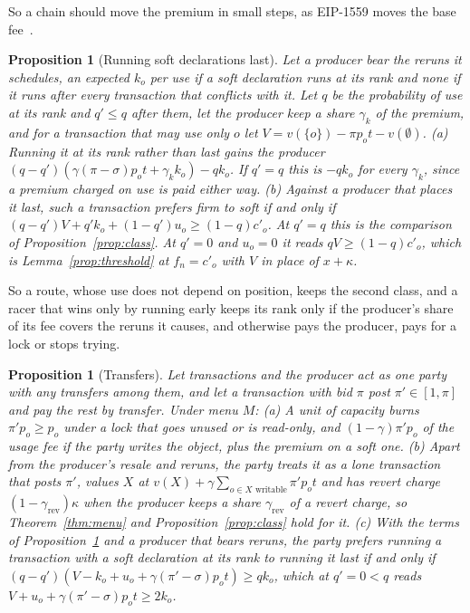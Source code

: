 \documentclass[conference,compsoc]{IEEEtran}
\numberwithin{equation}{section}
\theoremstyle{plain}
\newtheorem{proposition}[theorem]{Proposition}
\theoremstyle{definition}
\theoremstyle{remark}
\newcommand{\cp}{c'}
\begin{document}
So a chain should move the premium in small steps, as EIP-1559 moves the base fee~\cite{roughgarden2024transaction}.

\begin{proposition}[Running soft declarations last]\label{prop:place}
Let a producer bear the reruns it schedules, an expected $k_o$ per use if a soft declaration runs at its rank and none if it runs after every transaction that conflicts with it. Let $q$ be the probability of use at its rank and $q' \le q$ after them, let the producer keep a share $\gamma_k$ of the premium, and for a transaction that may use only $o$ let $V = v(\{o\}) - \pi p_o t - v(\emptyset)$. \textup{(a)} Running it at its rank rather than last gains the producer $(q - q')(\gamma(\pi - \sigma) p_o t + \gamma_k k_o) - q k_o$. If $q' = q$ this is $-q k_o$ for every $\gamma_k$, since a premium charged on use is paid either way. \textup{(b)} Against a producer that places it last, such a transaction prefers firm to soft if and only if $(q - q')V + q' k_o + (1 - q') u_o \ge (1 - q)\cp_o$. At $q' = q$ this is the comparison of Proposition~\ref{prop:class}. At $q' = 0$ and $u_o = 0$ it reads $qV \ge (1-q)\cp_o$, which is Lemma~\ref{prop:threshold} at $f_n = \cp_o$ with $V$ in place of $x + \kappa$.
\end{proposition}

So a route, whose use does not depend on position, keeps the second class, and a racer that wins only by running early keeps its rank only if the producer's share of its fee covers the reruns it causes, and otherwise pays the producer, pays for a lock or stops trying.

\begin{proposition}[Transfers]\label{prop:transfers}
Let transactions and the producer act as one party with any transfers among them, and let a transaction with bid $\pi$ post $\pi' \in [1, \pi]$ and pay the rest by transfer. Under menu $M$:
\textup{(a)} A unit of capacity burns $\pi' p_o \ge p_o$ under a lock that goes unused or is read-only, and $(1-\gamma)\pi' p_o$ of the usage fee if the party writes the object, plus the premium on a soft one.
\textup{(b)} Apart from the producer's resale and reruns, the party treats it as a lone transaction that posts $\pi'$, values $X$ at $v(X) + \gamma \sum_{o \in X \text{ writable}} \pi' p_o t$ and has revert charge $(1-\gamma_{\mathrm{rev}})\kappa$ when the producer keeps a share $\gamma_{\mathrm{rev}}$ of a revert charge, so Theorem~\ref{thm:menu} and Proposition~\ref{prop:class} hold for it.
\textup{(c)} With the terms of Proposition~\ref{prop:place} and a producer that bears reruns, the party prefers running a transaction with a soft declaration at its rank to running it last if and only if $(q-q')(V - k_o + u_o + \gamma(\pi'-\sigma)p_o t) \ge q k_o$, which at $q' = 0 < q$ reads $V + u_o + \gamma(\pi'-\sigma)p_o t \ge 2k_o$.
\end{proposition}
\end{document}
